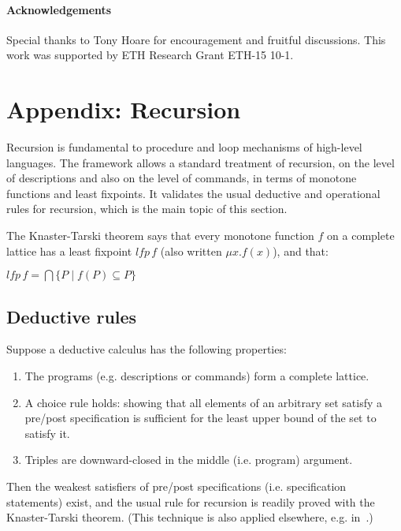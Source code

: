 \documentclass[a4paper,leqno]{llncs}
\newcommand{\aleq}{\ensuremath{\subseteq}}
\newcommand{\aglb}{\ensuremath{\bigcap}}
\newcommand{\lfp}[1]{\ensuremath{\mathit{lfp\,}{#1}}}
\newcommand{\BEGINMYDEF}{\begin{trivlist}\item}
\newcommand{\ENDMYDEF}{\end{trivlist}}
\begin{document}
\paragraph{Acknowledgements} Special thanks to Tony Hoare for encouragement and fruitful discussions. This work was supported by ETH Research Grant ETH-15 10-1.



\section*{Appendix: Recursion}
Recursion is fundamental to procedure and loop mechanisms of high-level languages. The framework allows a standard treatment of recursion, on the level of descriptions and also on the level of commands, in terms of monotone functions and least fixpoints. It validates the usual deductive and operational rules for recursion, which is the main topic of this section.

The Knaster-Tarski theorem says that every monotone function $f$ on a complete lattice has a least fixpoint \lfp{f} (also written $\mu x . f(x)$), and that:
\BEGINMYDEF
$\lfp{f} = \aglb\{P \mid f(P) \aleq P\}$
\ENDMYDEF

\subsection*{Deductive rules}
Suppose a deductive calculus has the following properties:
\begin{enumerate}
 \item The programs (e.g. descriptions or commands) form a complete lattice.
 \item A choice rule holds: showing that all elements of an arbitrary set satisfy a pre/post specification is sufficient for the least upper bound of the set to satisfy it.
 \item Triples are downward-closed in the middle (i.e. program) argument.
\end{enumerate}
Then the weakest satisfiers of pre/post specifications (i.e. specification statements) exist, and the usual rule for recursion is readily proved with the Knaster-Tarski theorem. (This technique is also applied elsewhere, e.g. in~\cite{hoare11locality}.)
\end{document}
